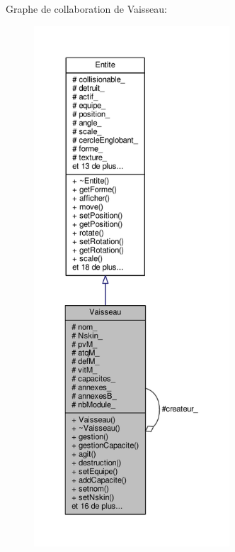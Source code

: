 Graphe de collaboration de Vaisseau\+:\nopagebreak
\begin{figure}[H]
\begin{center}
\leavevmode
\includegraphics[height=550pt]{class_vaisseau__coll__graph}
\end{center}
\end{figure}
